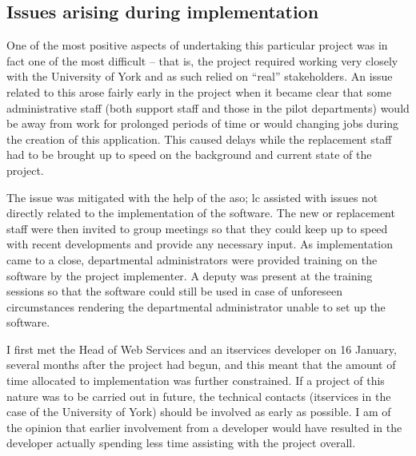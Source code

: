
\subsection{Issues arising during implementation}
\label{sec:issuesarising}


\mynobreakpar

One of the most positive aspects of undertaking this particular project was in
fact one of the most difficult -- that is, the project required working very
closely with the University of York and as such relied on ``real''
stakeholders. An issue related to this arose fairly early in the project when
it became clear that some administrative staff (both support staff and those
in the pilot departments) would be away from work for prolonged periods of
time or would changing jobs during the creation of this application. This
caused delays while the replacement staff had to be brought up to speed on the
background and current state of the project.

The issue was mitigated with the help of the \gls{aso}; \gls{lc} assisted with
issues not directly related to the implementation of the software. The new or
replacement staff were then invited to group meetings so that they could keep
up to speed with recent developments and provide any necessary input. As
implementation came to a close, departmental administrators were provided
training on the software by the project implementer. A deputy was present at
the training sessions so that the software could still be used in case of
unforeseen circumstances rendering the departmental administrator unable to
set up the software.

\mynobreakpar

I first met the Head of Web Services and an \gls{itservices} developer on 16
January, several months after the project had begun, and this meant that the
amount of time allocated to implementation was further constrained. If a
project of this nature was to be carried out in future, the technical contacts
(\gls{itservices} in the case of the University of York) should be involved as
early as possible. I am of the opinion that earlier involvement from a
developer would have resulted in the developer actually spending less time
assisting with the project overall.

